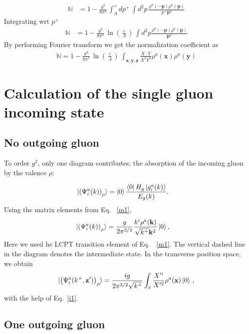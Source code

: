\documentclass[aps,prd,amsmath,amssymb,nofootinbib]{revtex4-2}
\def\mf#1{\mathbb{#1}}
\def\v#1{\mathbf{#1}}
\numberwithin{equation}{section}
\begin{document}
\begin{align}\label{normmom}
    \mf{N} & = 1- \frac{g^2}{8 \pi^3 }\, \int_{\Lambda}^{\vee} dp^{+}\,
  \int d^2p\, \frac{\rho^a(-\v{p}) \rho^a(\v{p})}{p^{+}\v{p}^2}
\end{align}
Integrating wrt $p^{+}$
\begin{align}
\mf{N} & =  
 1 - \frac{g^2}{8 \pi^3 }\,\ln\left(\frac{\vee}{\Lambda}\right)\,
\int d^2p \frac{\rho^a(-\v{p}) \rho^a(\v{p})}{\v{p}^2}
\end{align}
By performing Fourier transform we get the normalization coefficient as
\begin{align}\label{normpos}
\mf{N} =  
 1 - \frac{g^2}{8 \pi^3 }\,\ln\left(\frac{\vee}{\Lambda}\right)\, 
  \int_{\v{x}, \v{y},\v{z}} \frac{X\cdot Y}{X^2 Y^2}   \rho^a(\v{x}) \rho^a(\v{y})
\end{align}
\section{Calculation of the single gluon incoming state}\label{sec:singleglue}
\subsection{No outgoing gluon}
To order $g^2$, only one diagram contributes: the absorption of the incoming gluon by the valence $\rho$: 
\begin{figure}[h]
\end{figure}
\begin{align}%
\ket{ \left(\Psi^{a}_{i}(k) \right)_{\rho} }   & =
   \ket{0}\frac{\bra{0}H_{g}\ket{g^a_{i}(k)}}{E_{g}(k)}.
\end{align}   
Using the matrix elements from Eq.~ \eqref{m1},
\begin{align}
  \ket{ \left(\Psi^{a}_{i}(k) \right)_{\rho} }   & =     \frac{g}{ 2\pi^{3/2}}\frac{k^i \rho^{a}(\v{k})}{\sqrt{k^+} \v{k}^{2}} \ket{0},
 \end{align}
Here we used he LCPT transition element of Eq.~~\eqref{m1}. The vertical dashed line in the diagram denotes the intermediate state. In the transverse position space, we obtain
\begin{equation}
  \ket{  \left(\Psi^{a}_{i}(k^+, \v{z}') \right)_{\rho} }  = \frac{ig}{2\pi^{3/2}\sqrt{ k^+}}\int_{x}\frac{X^{\prime i}}{X^{\prime 2}} \rho^{a}(\v{x})\ket{0}\,, 
\end{equation}
with the help of Eq.~\eqref{i1}. 
\subsection{One outgoing gluon}
\end{document}
